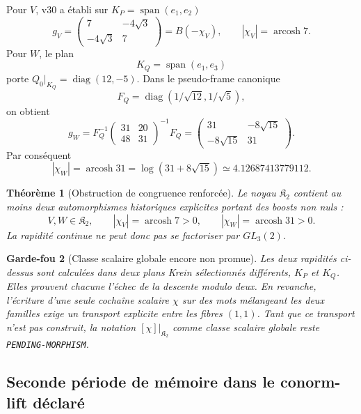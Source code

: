 \documentclass[11pt,a4paper]{article}
\newtheorem{theorem}{Théorème}[section]
\newtheorem{guardrail}[theorem]{Garde-fou}
\newcommand{\certPending}{\texttt{PENDING-MORPHISM}}
\begin{document}
Pour $V$, v30 a établi sur
$K_P=\operatorname{span}(e_1,e_2)$
\[
 g_V=
 \begin{pmatrix}
 7&-4\sqrt3\\
 -4\sqrt3&7
 \end{pmatrix}
 =B(-\chi_V),
 \qquad
 |\chi_V|=\operatorname{arcosh}7.
\]
Pour $W$, le plan
\[
 K_Q=\operatorname{span}(e_1,e_3)
\]
porte $Q_0|_{K_Q}=\operatorname{diag}(12,-5)$. Dans le pseudo-frame canonique
\[
 F_Q=\operatorname{diag}(1/\sqrt{12},1/\sqrt5),
\]
on obtient
\begin{equation}\label{eq:v31-gW}
 \boxed{
 g_W
 =F_Q^{-1}
 \begin{pmatrix}31&20\\48&31\end{pmatrix}^{-1}
 F_Q
 =
 \begin{pmatrix}
 31&-8\sqrt{15}\\
 -8\sqrt{15}&31
 \end{pmatrix}.}
\end{equation}
Par conséquent
\begin{equation}\label{eq:v31-chiW}
 \boxed{
 |\chi_W|
 =\operatorname{arcosh}31
 =\log(31+8\sqrt{15})
 \simeq4.12687413779112.}
\end{equation}

\begin{theorem}[Obstruction de congruence renforcée]\label{thm:v31-two-kernel-boosts}
Le noyau $\mathfrak K_2$ contient au moins deux automorphismes historiques explicites portant des
boosts non nuls :
\[
 \boxed{
 V,W\in\mathfrak K_2,
 \qquad
 |\chi_V|=\operatorname{arcosh}7>0,
 \qquad
 |\chi_W|=\operatorname{arcosh}31>0.}
\]
La rapidité continue ne peut donc pas se factoriser par $GL_3(2)$.
\end{theorem}

\begin{guardrail}[Classe scalaire globale encore non promue]
Les deux rapidités ci-dessus sont calculées dans deux plans Krein sélectionnés différents,
$K_P$ et $K_Q$. Elles prouvent chacune l'échec de la descente modulo deux. En revanche,
l'écriture d'une seule cochaîne scalaire $\chi$ sur des mots mélangeant les deux familles exige un
transport explicite entre les fibres $(1,1)$. Tant que ce transport n'est pas construit, la notation
$[\chi]|_{\mathfrak K_2}$ comme classe scalaire globale reste \certPending{}.
\end{guardrail}

\subsection{Seconde période de mémoire dans le conorm-lift déclaré}
\end{document}

